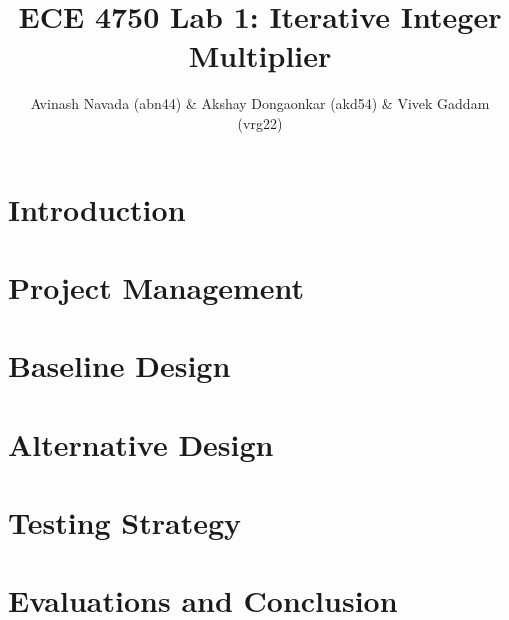 \documentclass[10pt]{article}
\begin{document}
\title{ECE 4750 Lab 1: Iterative Integer Multiplier}
\author{Avinash Navada (abn44) \& Akshay Dongaonkar (akd54) \& Vivek Gaddam (vrg22)}
\maketitle

\section{Introduction}

\section{Project Management}

\section{Baseline Design}

\section{Alternative Design}

\section{Testing Strategy}

\section{Evaluations and Conclusion}
\end{document}
